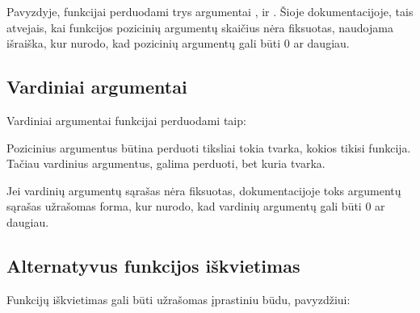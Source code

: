 \documentclass[letterpaper,10pt,lithuanian]{sphinxmanual}
\begin{document}
\begin{sphinxVerbatim}[commandchars=\\\{\}]
  
\end{sphinxVerbatim}

\sphinxAtStartPar
Pavyzdyje, funkcijai  perduodami trys argumentai ,  ir . Šioje
dokumentacijoje, tais atvejais, kai funkcijos pozicinių argumentų skaičius nėra
fiksuotas, naudojama  išraiška, kur \sphinxcode{\sphinxupquote{*}} nurodo, kad pozicinių argumentų
gali būti 0 ar daugiau.


\subsection{Vardiniai argumentai}
\label{\detokenize{formules:vardiniai-argumentai}}
\sphinxAtStartPar
Vardiniai argumentai funkcijai perduodami taip:

\begin{sphinxVerbatim}[commandchars=\\\{\}]
     
\end{sphinxVerbatim}

\sphinxAtStartPar
Pozicinius argumentus būtina perduoti tiksliai tokia tvarka, kokios tikisi
funkcija. Tačiau vardinius argumentus, galima perduoti, bet kuria tvarka.

\sphinxAtStartPar
Jei vardinių argumentų sąrašas nėra fiksuotas, dokumentacijoje toks argumentų
sąrašas užrašomas  forma, kur \sphinxcode{\sphinxupquote{**}} nurodo, kad vardinių argumentų
gali būti 0 ar daugiau.


\subsection{Alternatyvus funkcijos iškvietimas}
\label{\detokenize{formules:alternatyvus-funkcijos-iskvietimas}}
\sphinxAtStartPar
Funkcijų iškvietimas gali būti užrašomas įprastiniu būdu, pavyzdžiui:

\begin{sphinxVerbatim}[commandchars=\\\{\}]
  
\end{sphinxVerbatim}
\end{document}

